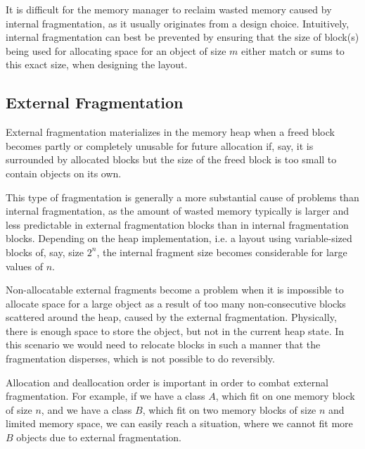It is difficult for the memory manager to reclaim wasted memory caused by internal fragmentation, as it usually originates from a design choice.
Intuitively, internal fragmentation can best be prevented by ensuring that the size of block(s) being used for allocating space for an object of size $m$ either match or sums to this exact size, when designing the layout. 

\subsection{External Fragmentation}
\label{subsec:external-fragmentation}
External fragmentation materializes in the memory heap when a freed block becomes partly or completely unusable for future allocation if, say, it is surrounded by allocated blocks but the size of the freed block is too small to contain objects on its own.

This type of fragmentation is generally a more substantial cause of problems than internal fragmentation, as the amount of wasted memory typically is larger and less predictable in external fragmentation blocks than in internal fragmentation blocks. Depending on the heap implementation, i.e. a layout using variable-sized blocks of, say, size $2^n$, the internal fragment size becomes considerable for large values of $n$. 

Non-allocatable external fragments become a problem when it is impossible to allocate space for a large object as a result of too many non-consecutive blocks scattered around the heap, caused by the external fragmentation. Physically, there is enough space to store the object, but not in the current heap state. In this scenario we would need to relocate blocks in such a manner that the fragmentation disperses, which is not possible to do reversibly.

Allocation and deallocation order is important in order to combat external fragmentation. For example, if we have a class $A$, which fit on one memory block of size $n$, and we have a class $B$, which fit on two memory blocks of size $n$ and limited memory space, we can easily reach a situation, where we cannot fit more $B$ objects due to external fragmentation.

